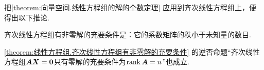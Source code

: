 把\cref{theorem:向量空间.线性方程组的解的个数定理} 应用到齐次线性方程组上，便得出以下推论.
\begin{corollary}\label{theorem:线性方程组.齐次线性方程组有非零解的充要条件}
齐次线性方程组有非零解的充要条件是：它的系数矩阵的秩小于未知量的数目.
\end{corollary}
\cref{theorem:线性方程组.齐次线性方程组有非零解的充要条件}
的逆否命题“齐次线性方程组\(\boldsymbol{A}\boldsymbol{X}=\boldsymbol{0}\)只有零解的充要条件为\(\rank\boldsymbol{A}=n\)”也成立.
